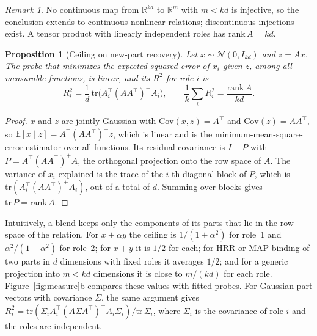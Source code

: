 \documentclass[10pt]{article}
\theoremstyle{plain}
\newtheorem{proposition}{Proposition}
\theoremstyle{remark}
\newtheorem*{remark}{Remark}
\newcommand{\R}{\mathbb{R}}
\begin{document}
\begin{remark}
No continuous map from $\R^{kd}$ to $\R^m$ with $m < kd$ is injective, so the conclusion extends to continuous nonlinear relations; discontinuous injections exist. A tensor product with linearly independent roles has $\mathrm{rank}\,A = kd$.
\end{remark}

\begin{proposition}[Ceiling on new-part recovery]
\label{prop:ceiling}
Let $x \sim \mathcal{N}(0, I_{kd})$ and $z = Ax$. The probe that minimizes the expected squared error of $x_i$ given $z$, among all measurable functions, is linear, and its $R^2$ for role $i$ is
\begin{equation}
  R^2_i = \frac{1}{d}\,\mathrm{tr}\big(A_i^{\top} (A A^{\top})^{+} A_i\big), \qquad \frac{1}{k}\sum_i R^2_i = \frac{\mathrm{rank}\,A}{kd}.
\end{equation}
\end{proposition}

\begin{proof}
$x$ and $z$ are jointly Gaussian with $\mathrm{Cov}(x, z) = A^{\top}$ and $\mathrm{Cov}(z) = AA^{\top}$, so $\mathbb{E}[x \mid z] = A^{\top}(AA^{\top})^{+}z$, which is linear and is the minimum-mean-square-error estimator over all functions. Its residual covariance is $I - P$ with $P = A^{\top}(AA^{\top})^{+}A$, the orthogonal projection onto the row space of $A$. The variance of $x_i$ explained is the trace of the $i$-th diagonal block of $P$, which is $\mathrm{tr}(A_i^{\top}(AA^{\top})^{+}A_i)$, out of a total of $d$. Summing over blocks gives $\mathrm{tr}\,P = \mathrm{rank}\,A$.
\end{proof}

\noindent
Intuitively, a blend keeps only the components of its parts that lie in the row space of the relation. For $x + \alpha y$ the ceiling is $1/(1 + \alpha^2)$ for role~1 and $\alpha^2/(1 + \alpha^2)$ for role~2; for $x + y$ it is $1/2$ for each; for HRR or MAP binding of two parts in $d$ dimensions with fixed roles it averages $1/2$; and for a generic projection into $m < kd$ dimensions it is close to $m/(kd)$ for each role. Figure~\ref{fig:measure}b compares these values with fitted probes. For Gaussian part vectors with covariance $\Sigma$, the same argument gives $R^2_i = \mathrm{tr}(\Sigma_i A_i^{\top}(A\Sigma A^{\top})^{+}A_i\Sigma_i)/\mathrm{tr}\,\Sigma_i$, where $\Sigma_i$ is the covariance of role $i$ and the roles are independent.
\end{document}
